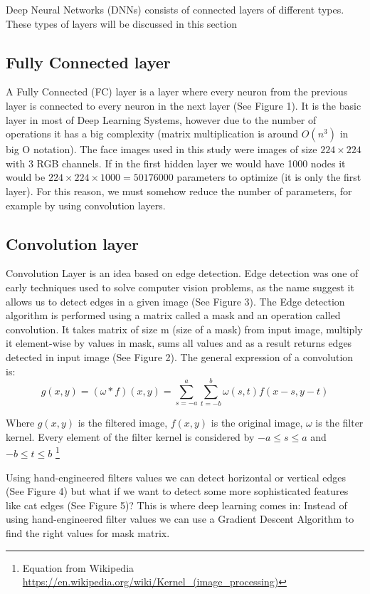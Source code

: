 Deep Neural Networks (DNNs) consists of connected layers of different types. These types of layers will be discussed in this section

\subsection{Fully Connected layer}

A Fully Connected (FC) layer is a layer where every neuron from the previous layer is connected to every neuron in the next layer (See Figure 1). It is the basic layer in most of Deep Learning Systems, however due to the number of operations it has a big complexity (matrix multiplication is around $O(n^3)$  in big O notation). The face images used in this study were images of size $224 \times 224$ with 3 RGB channels. If in the first hidden layer we would have 1000 nodes it would be $224 \times 224 \times 1000 = 50176000$ parameters to optimize (it is only the first layer). For this reason, we must somehow reduce the number of parameters, for example by using convolution layers. 

\subsection{Convolution layer}

Convolution Layer is an idea based on edge detection. Edge detection was one of early techniques used to solve computer vision problems, as the name suggest it allows us to detect edges in a given image (See Figure 3). The Edge detection  algorithm  is  performed using a matrix called a mask and an operation called convolution. It takes matrix of size m (size of a mask) from input image, multiply it element-wise by values in mask, sums all values and as a result returns edges detected in input image (See Figure 2). The general expression of a convolution is: 
\begin{equation}
g(x, y)=(\omega * f)(x, y)=\sum_{s=-a}^{a} \sum_{t=-b}^{b} \omega(s, t) f(x-s, y-t)
\end{equation}

Where $g(x,y)$ is the filtered image, $f(x,y)$ is the original image, $\omega$ is the filter kernel. Every element of the filter kernel is considered by $-a \leqslant s \leqslant a$ and $-b \leqslant t \leqslant b$ \footnote{Equation from Wikipedia \url{https://en.wikipedia.org/wiki/Kernel_(image_processing)}}
\newline

Using hand-engineered filters values we can detect horizontal or vertical edges (See Figure 4) but what if we want to detect some more sophisticated features like cat edges (See Figure 5)? This is where deep learning comes in: Instead of using hand-engineered filter values we can use a Gradient Descent Algorithm to find the right values for mask matrix.


